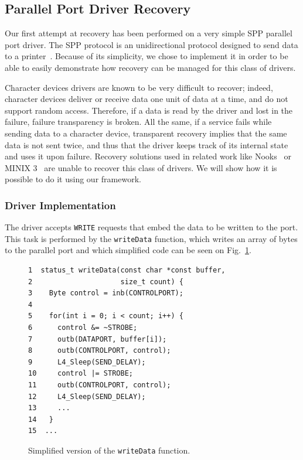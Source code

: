 \documentclass[times, 10pt, twocolumn]{article}
\begin{document}
\subsection{Parallel Port Driver Recovery}
Our first attempt at recovery has been performed on a very simple SPP parallel port driver. The SPP protocol is an unidirectional protocol designed to send data to a printer~\cite{Peacock2007}. Because of its simplicity, we chose to implement it in order to be able to easily demonstrate how recovery can be managed for this class of drivers.

Character devices drivers are known to be very difficult to recover; indeed, character devices deliver or receive data one unit of data at a time, and do not support random access. Therefore, if a data is read by the driver and lost in the failure, failure transparency is broken. All the same, if a service fails while sending data to a character device, transparent recovery implies that the same data is not sent twice, and thus that the driver keeps track of its internal state and uses it upon failure. Recovery solutions used in related work like Nooks~\cite{Swift2003} or MINIX 3~\cite{Herder2007} are unable to recover this class of drivers. We will show how it is possible to do it using our framework.

\subsubsection{Driver Implementation}
The driver accepts \texttt{WRITE} requests that embed the data to be written to the port. This task is performed by the \texttt{writeData} function, which writes an array of bytes to the parallel port and which simplified code can be seen on Fig.~\ref{fig:writeData}.

\begin{figure}[ht]
\centering
\begin{screen}
\scriptsize{
\begin{verbatim}
1  status_t writeData(const char *const buffer,
2                     size_t count) {
3    Byte control = inb(CONTROLPORT);
4 
5    for(int i = 0; i < count; i++) {
6      control &= ~STROBE;
7      outb(DATAPORT, buffer[i]);
8      outb(CONTROLPORT, control);
9      L4_Sleep(SEND_DELAY);
10     control |= STROBE;
11     outb(CONTROLPORT, control);
12     L4_Sleep(SEND_DELAY);
13     ...
14   }
15  ...
\end{verbatim}
}
\end{screen}
\caption{Simplified version of the \texttt{writeData} function.}
\label{fig:writeData}
\end{figure}
\end{document}
